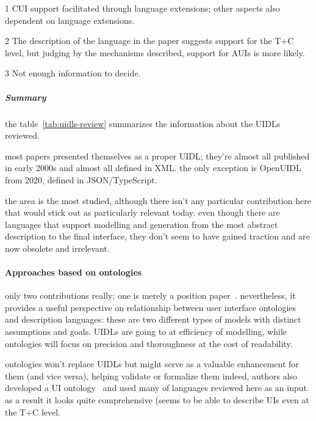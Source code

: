 \begin{table}[]
\begin{threeparttable}[b]
\begin{tabularx}{\textwidth}{lrCCC}
            \bottomrule
        \end{tabularx}
        \begin{tablenotes}
            \item[1] CUI support facilitated through language extensions;
                     other aspects also dependent on language extensions.
            \item[2] The description of the language in the paper suggests support for the T+C level, but judging by the mechanisms described, support for AUIs is more likely.
            \item[3] Not enough information to decide.
        \end{tablenotes}
    \end{threeparttable}
\end{table}

\subparagraph{Summary}
the table~\ref{tab:uidls-review} summarizes the information about the UIDLs reviewed.

most papers presented themselves as a proper UIDL;
they're almost all published in early 2000s and almost all defined in XML\@.
the only exception is OpenUIDL from 2020, defined in JSON/TypeScript.

the area is the most studied, although there isn't any particular contribution here that would stick out as particularly relevant today.
even though there are languages that support modelling and generation from the most abstract description to the final interface, they don't seem to have gained traction and are now obsolete and irrelevant.


\paragraph{Approaches based on ontologies}

only two contributions really;
one is merely a position paper~\cite{paulheim_formal_2011}.
nevertheless, it provides a useful perspective on relationship between user interface ontologies and description languages:
these are two different types of models with distinct assumptions and goals.
UIDLs are going to at efficiency of modelling, while ontologies will focus on precision and thoroughness at the cost of readability.

ontologies won't replace UIDLs but might serve as a valuable enhancement for them (and vice versa), helping validate or formalize them\,\textemdash\,indeed, authors also developed a UI ontology~\cite{paulheim_ui2ont_2013} and used many of languages reviewed here as an input.
as a result it looks quite comprehensive (seems to be able to describe UIs even at the T+C level.

